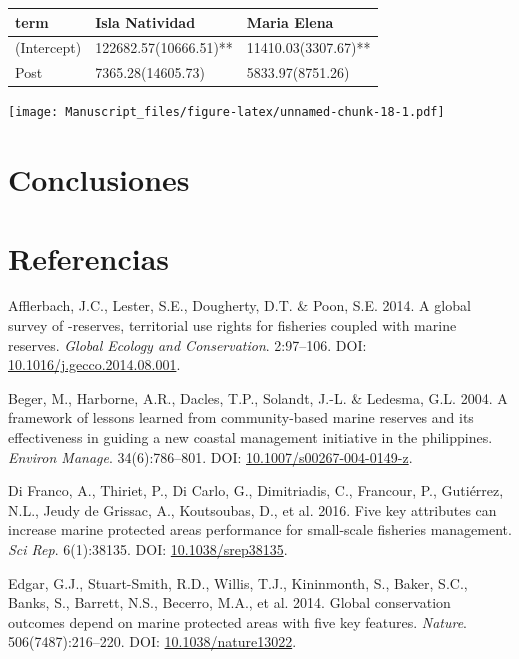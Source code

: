 \documentclass[12pt,]{article}
\begin{document}
\begin{tabular}{lll}
\toprule
term & Isla Natividad & Maria Elena\\
\midrule
(Intercept) & 122682.57(10666.51)** & 11410.03(3307.67)**\\
Post & 7365.28(14605.73) & 5833.97(8751.26)\\
\bottomrule
\end{tabular}

\texttt{[image: Manuscript\_files/figure-latex/unnamed-chunk-18-1.pdf]}

\section{Conclusiones}\label{conclusiones}

\section*{Referencias}\label{referencias}

\hypertarget{refs}{}
\hypertarget{ref-afflerbach_2014-HP}{}
Afflerbach, J.C., Lester, S.E., Dougherty, D.T. \& Poon, S.E. 2014. A
global survey of -reserves, territorial use rights for fisheries coupled
with marine reserves. \emph{Global Ecology and Conservation}. 2:97--106.
DOI:
\href{https://doi.org/10.1016/j.gecco.2014.08.001}{10.1016/j.gecco.2014.08.001}.

\hypertarget{ref-beger_2004-Y8}{}
Beger, M., Harborne, A.R., Dacles, T.P., Solandt, J.-L. \& Ledesma, G.L.
2004. A framework of lessons learned from community-based marine
reserves and its effectiveness in guiding a new coastal management
initiative in the philippines. \emph{Environ Manage}. 34(6):786--801.
DOI:
\href{https://doi.org/10.1007/s00267-004-0149-z}{10.1007/s00267-004-0149-z}.

\hypertarget{ref-difranco_2016-Xw}{}
Di Franco, A., Thiriet, P., Di Carlo, G., Dimitriadis, C., Francour, P.,
Gutiérrez, N.L., Jeudy de Grissac, A., Koutsoubas, D., et al. 2016. Five
key attributes can increase marine protected areas performance for
small-scale fisheries management. \emph{Sci Rep}. 6(1):38135. DOI:
\href{https://doi.org/10.1038/srep38135}{10.1038/srep38135}.

\hypertarget{ref-edgar_2014-UO}{}
Edgar, G.J., Stuart-Smith, R.D., Willis, T.J., Kininmonth, S., Baker,
S.C., Banks, S., Barrett, N.S., Becerro, M.A., et al. 2014. Global
conservation outcomes depend on marine protected areas with five key
features. \emph{Nature}. 506(7487):216--220. DOI:
\href{https://doi.org/10.1038/nature13022}{10.1038/nature13022}.
\end{document}
